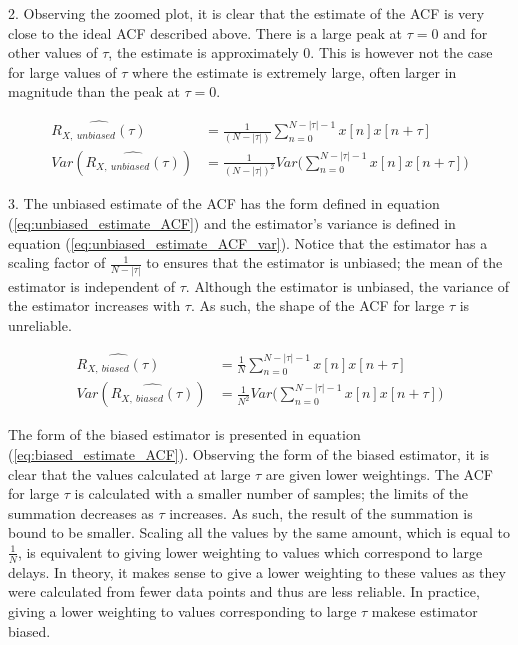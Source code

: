 \documentclass{article}
\begin{document}
2. Observing the zoomed plot, it is clear that the estimate of the ACF is very close to the ideal ACF described above. There is a large peak at $\tau = 0$ and for other values of $\tau$, the estimate is approximately 0. This is however not the case for large values of $\tau$ where the estimate is extremely large, often larger in magnitude than the peak at $\tau = 0$.


\begin{align}
    \hat{R_{X, \ unbiased}(\tau)} &= \frac{1}{(N-|\tau|)}\sum_{n=0}^{N-|\tau|-1}x[n]x[n+\tau]\label{eq:unbiased_estimate_ACF}\\
    Var(\hat{R_{X, \ unbiased}(\tau)}) &= \frac{1}{(N-|\tau|)^2}Var\bigg(\sum_{n=0}^{N-|\tau|-1}x[n]x[n+\tau]\bigg)\label{eq:unbiased_estimate_ACF_var}
\end{align}

3. The unbiased estimate of the ACF has the form defined in equation (\ref{eq:unbiased_estimate_ACF}) and the estimator's variance is defined in equation (\ref{eq:unbiased_estimate_ACF_var}). Notice that the estimator has a scaling factor of $\frac{1}{N-|\tau|}$ to ensures that the estimator is unbiased; the mean of the estimator is independent of $\tau$. Although the estimator is unbiased, the variance of the estimator increases with $\tau$. As such, the shape of the ACF for large $\tau$ is unreliable.

\begin{align}
    \hat{R_{X, \ biased}(\tau)} &= \frac{1}{N}\sum_{n=0}^{N-|\tau|-1}x[n]x[n+\tau]\label{eq:biased_estimate_ACF}\\
     Var(\hat{R_{X, \ biased}(\tau)}) &= \frac{1}{N^2}Var\bigg(\sum_{n=0}^{N-|\tau|-1}x[n]x[n+\tau]\bigg)\label{eq:biased_estimate_ACF_var}
\end{align}

The form of the biased estimator is presented in equation (\ref{eq:biased_estimate_ACF}). Observing the form of the biased estimator, it is clear that the values calculated at large $\tau$ are given lower weightings. The ACF for large $\tau$ is calculated with a smaller number of samples; the limits of the summation decreases as $\tau$ increases. As such, the result of the summation is bound to be smaller. Scaling all the values by the same amount, which is equal to $\frac{1}{N}$, is equivalent to giving lower weighting to values which correspond to large delays. In theory, it makes sense to give a lower weighting to these values as they were calculated from fewer data points and thus are less reliable. In practice, giving a lower weighting to values corresponding to large $\tau$ makese estimator biased.\\ 
\end{document}
